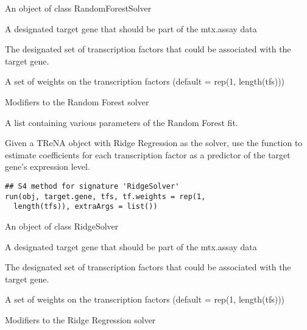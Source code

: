 \documentclass[a4paper]{book}
\begin{document}
%
\begin{Arguments}
\begin{ldescription}
\item[\code{obj}] An object of class RandomForestSolver

\item[\code{target.gene}] A designated target gene that should be part of the mtx.assay data

\item[\code{tfs}] The designated set of transcription factors that could be associated with the target gene.

\item[\code{tf.weights}] A set of weights on the transcription factors (default = rep(1, length(tfs)))

\item[\code{extraArgs}] Modifiers to the Random Forest solver
\end{ldescription}
\end{Arguments}
%
\begin{Value}
A list containing various parameters of the Random Forest fit.
\end{Value}
%
\begin{Description}\relax
Given a TReNA object with Ridge Regression as the solver, use the  function to estimate coefficients
for each transcription factor as a predictor of the target gene's expression level.
\end{Description}
%
\begin{Usage}
\begin{verbatim}
## S4 method for signature 'RidgeSolver'
run(obj, target.gene, tfs, tf.weights = rep(1,
  length(tfs)), extraArgs = list())
\end{verbatim}
\end{Usage}
%
\begin{Arguments}
\begin{ldescription}
\item[\code{obj}] An object of class RidgeSolver

\item[\code{target.gene}] A designated target gene that should be part of the mtx.assay data

\item[\code{tfs}] The designated set of transcription factors that could be associated with the target gene.

\item[\code{tf.weights}] A set of weights on the transcription factors (default = rep(1, length(tfs)))

\item[\code{extraArgs}] Modifiers to the Ridge Regression solver
\end{ldescription}
\end{Arguments}
\end{document}
